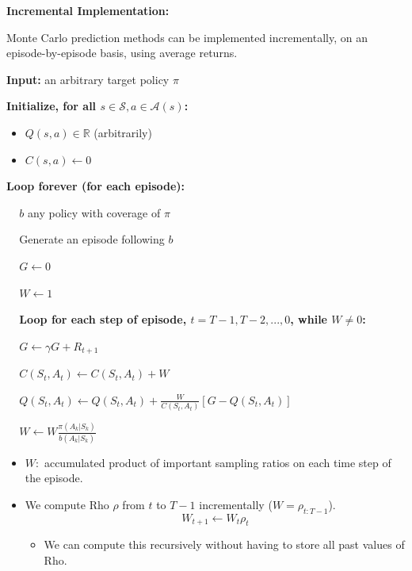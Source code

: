 \documentclass[12pt, a4paper]{article}
\begin{document}
\textbf{Incremental Implementation:}

Monte Carlo prediction methods can be implemented incrementally, on an episode-by-episode basis, using average returns.


\begin{tcolorbox}[title={Off-policy MC prediction (policy evaluation) for estimating $Q \approx q_\pi$}]


\textbf{Input:} an arbitrary target policy $\pi$

\textbf{Initialize, for all $s \in \mathcal{S}, a \in \mathcal{A}(s)$:}
\begin{itemize}
 \item $Q(s,a) \in \mathbb{R}$ (arbitrarily)
 \item $C(s,a) \leftarrow 0$
\end{itemize}

\textbf{Loop forever (for each episode):}
\begin{description}
   \item $\;\;\;$ $b$ any policy with coverage of $\pi$
   \item $\;\;\;$ Generate an episode following $b$
   \item $\;\;\;$ $G \leftarrow 0$
   \item $\;\;\;$ $W \leftarrow 1$
   \item $\;\;\;$ \textbf{Loop for each step of episode, $t=T-1,T-2,...,0$, while $W \neq 0$:}
   \begin{description}
     \item $\;\;\;$ $G \leftarrow \gamma G + R_{t+1}$
     \item $\;\;\;$ $C(S_t,A_t) \leftarrow C(S_t,A_t) + W$
     \item $\;\;\;$ $Q(S_t,A_t) \leftarrow Q(S_t,A_t) + \frac{W}{C(S_t,A_t)} [G - Q(S_t,A_t)]$
     \item $\;\;\;$ $W \leftarrow W\frac{\pi(A_k | S_k)}{b(A_k | S_k)}$
   \end{description}
\end{description}
\end{tcolorbox}

\begin{itemize}
  \item $W:$ accumulated product of important sampling ratios on each time step of the episode.
  \item We compute Rho $\rho$ from $t$ to $T-1$ incrementally ($W = \rho_{t:T-1}$).
  $$
  W_{t+1} \leftarrow W_t \rho_t
  $$
  \begin{itemize}
    \item We can compute this recursively without having to store all past values of Rho.
  \end{itemize}
\end{itemize}
\end{document}
